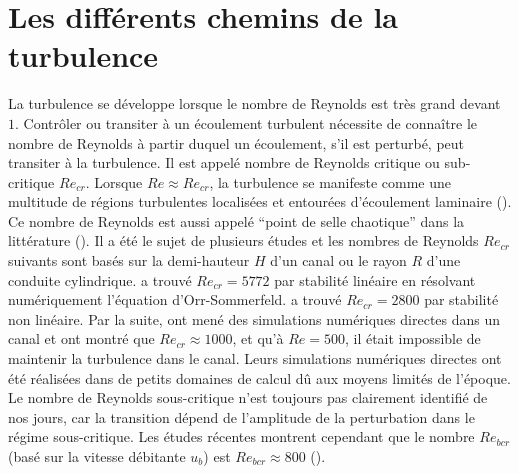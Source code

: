 \section{Les différents chemins de la turbulence}
\label{sec/path_to_turbulence}

La turbulence se développe lorsque le nombre de Reynolds est très grand devant $1$. Contrôler ou transiter à un écoulement turbulent nécessite de connaître le nombre de Reynolds à partir duquel un écoulement, s’il est perturbé, peut transiter à la turbulence. Il est appelé nombre de Reynolds critique ou sub-critique $Re_{cr}$. Lorsque $Re \approx Re_{cr}$, la turbulence se manifeste comme une multitude de régions turbulentes localisées et entourées d’écoulement laminaire (\cite{Wygnanski1973}). Ce nombre de Reynolds est aussi appelé \foreignquote{french}{point de selle chaotique} dans la littérature (\cite{Eckhardt2007}). Il a été le sujet de plusieurs études et les nombres de Reynolds $Re_{cr}$ suivants sont basés sur la demi-hauteur $H$ d'un canal ou le rayon $R$ d'une conduite cylindrique. \cite{Orszag1971} a trouvé $Re_{cr}=5 772$ par stabilité linéaire en résolvant numériquement l’équation d’Orr-Sommerfeld. \cite{Stuart1960} a trouvé $Re_{cr}=2800$ par stabilité non linéaire. Par la suite, \citet*{Orszag1980} ont mené des simulations numériques directes dans un canal et ont montré que $Re_{cr} \approx 1000$, et qu’à $Re=500$, il était impossible de maintenir la turbulence dans le canal. Leurs simulations numériques directes ont été réalisées dans de petits domaines de calcul dû aux moyens limités de l'époque. Le nombre de Reynolds sous-critique n'est toujours pas clairement identifié de nos jours, car la transition dépend de l'amplitude de la perturbation dans le régime sous-critique. Les études récentes montrent cependant que le nombre $Re_{bcr}$ (basé sur la vitesse débitante $u_{b}$) est $Re_{bcr} \approx 800$ (\cite{Yimprasert2021}).\\

